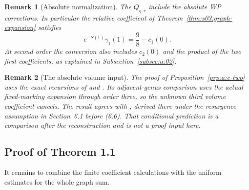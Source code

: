 \documentclass[a4paper,10pt]{article}
\numberwithin{equation}{section}
\theoremstyle{paperplain}
\theoremstyle{paperremark}
\newtheorem{rmk}{Remark}[section]
\theoremstyle{paperplain}
\begin{document}
\begin{rmk}[Absolute normalization]
The $Q_{q,r}$ include the absolute WP corrections. In particular
the relative coefficient of Theorem~\ref{thm:s03:graph-expansion}
satisfies
\[
 e^{-S(1)}\gamma_1(1)=\frac98-c_1(0).
\]
At second order the conversion also includes $c_2(0)$ and the product
of the two first coefficients, as explained in
Subsection~\ref{subsec:a:02}.
\end{rmk}

\begin{rmk}[The absolute volume input]
The proof of Proposition~\ref{prp:a:c-two} uses the exact recursions
of \cite[Section~2]{MZ15} and \cite[Theorem~4.3]{HMT25}. Its
adjacent-genus comparison uses the actual fixed-marking expansion
through order three, so the unknown third volume coefficient cancels.
The result agrees with \cite[(6.10)]{EGGLS24}, derived there under
the resurgence assumption in Section~6.1 before (6.6). That conditional
prediction is a comparison after the reconstruction and is not a
proof input here.
\end{rmk}

\subsection{Proof of Theorem 1.1}
\label{subsec:s04:04}

It remains to combine the finite coefficient calculations with the
uniform estimates for the whole graph sum.
\end{document}

